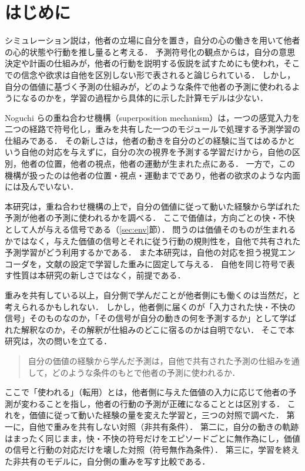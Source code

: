 \section{はじめに}\label{sec:intro}

シミュレーション説は，他者の立場に自分を置き，自分の心の働きを用いて他者の心的状態や行動を推し量ると考える\cite{gordon1986folk,goldman2006simulating}．
予測符号化の観点からは，自分の意思決定や計画の仕組みが，他者の行動を説明する仮説を試すためにも使われ，そこでの信念や欲求は自他を区別しない形で表されると論じられている\cite{gordon2021simulation}．
しかし，自分の価値に基づく予測の仕組みが，どのような条件で他者の予測に使われるようになるのかを，学習の過程から具体的に示した計算モデルは少ない．

Noguchi ら\cite{noguchi2022superposition}の重ね合わせ機構（superposition mechanism）は，一つの感覚入力を二つの経路で符号化し，重みを共有した一つのモジュールで処理する予測学習の仕組みである．
その新しさは，他者の動きを自分のどの経験に当てはめるかという自他の対応を与えずに，自分の次の視界を予測する学習だけから，自他の区別，他者の位置，他者の視点，他者の運動が生まれた点にある．
一方で，この機構が扱ったのは他者の位置・視点・運動までであり，他者の欲求のような内面には及んでいない\cite{noguchi2022superposition}．

本研究は，重ね合わせ機構の上で，自分の価値に従って動いた経験から学ばれた予測が他者の予測に使われるかを調べる．
ここで価値は，方向ごとの快・不快として人が与える信号である（\ref{sec:env}節）．
問うのは価値そのものが生まれるかではなく，与えた価値の信号とそれに従う行動の規則性を，自他で共有された予測学習がどう利用するかである．
また本研究は，自他の対応を担う視覚エンコーダを，文献\cite{noguchi2022superposition}の設定で学習した重みに固定して与える．
自他を同じ符号で表す性質は本研究の新しさではなく，前提である．

重みを共有している以上，自分側で学んだことが他者側にも働くのは当然だ，と考えられるかもしれない．
しかし，他者側に届くのが「入力された快・不快の信号」そのものなのか，「その信号が自分の動きの何を予測するか」として学ばれた解釈なのか，その解釈が仕組みのどこに宿るのかは自明でない．
そこで本研究は，次の問いを立てる．
\begin{quote}
  自分の価値の経験から学んだ予測は，自他で共有された予測の仕組みを通して，どのような条件のもとで他者の予測に使われるか．
\end{quote}
ここで「使われる」（転用）とは，他者側に与えた価値の入力に応じて他者の予測が変わることを指し，他者の行動の予測が正確になることとは区別する．
これを，価値に従って動いた経験の量を変えた学習と，三つの対照で調べた．
第一に，自他で重みを共有しない対照（非共有条件）．
第二に，自分の動きの軌跡はまったく同じまま，快・不快の符号だけをエピソードごとに無作為にし，価値の信号と行動の対応だけを壊した対照（符号無作為条件）．
第三に，学習を終えた非共有のモデルに，自分側の重みを写す比較である．

